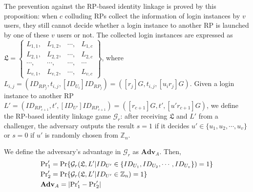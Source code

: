 The prevention against the RP-based identity linkage is proved
    by this proposition:
when $c$ colluding RPs collect the information of login instances by $v$ users,
    they still cannot decide whether a login instance to another RP is launched by one of these $v$ users or not.
The collected login instances are expressed as $\mathfrak{L}=\left\{ \begin{matrix}
L_{1,1}, & L_{1,2}, & \cdots, & L_{1,c}\\
L_{2,1}, & L_{2,2}, & \cdots, & L_{2,c}\\
\cdots, & \cdots, & \cdots, & \cdots\\
L_{v,1}, & L_{v,2}, & \cdots, & L_{v,c}
\end{matrix}\right\}$, where $L_{i, j} = (ID_{RP_j}, t_{i, j}, [ID_{U_i}]{ID_{RP_j}}) = ([r_j]G, t_{i,j}, [u_ir_j]G)$.
Given a login instance to another RP $L'=(ID_{RP_{c+1}}, t', [ID_{U'}]ID_{RP_{c+1}}) = ([r_{c+1}]G, t', [u'r_{c+1}]G)$,
we define the RP-based identity linkage game $\mathcal{G}_r$:
after receiving $\mathfrak{L}$ and $L'$ from a challenger,
    the adversary outputs the result $s = 1$ if it decides $u' \in \{u_1, u_2, \cdots, u_v\}$ or $s = 0$ if $u'$ is randomly chosen from $\mathbb{Z}_n$.


We define the adversary's advantage in $\mathcal{G}_r$ as $\mathbf{Adv}_{A}$.
Then,
\begin{align*}
&{\rm Pr}'_1={\rm Pr}\{\mathcal{G}_r(\mathfrak{L}, L'|ID_{U'} \in \{ID_{U_1}, ID_{U_2}, \cdots, ID_{U_v}\})=1\} \\
&{\rm Pr}'_2={\rm Pr}\{\mathcal{G}_r(\mathfrak{L}, L'|ID_{U'} \in \mathbb{Z}_n)=1\}\\
&{\mathbf{Adv}}_{A}=|{\rm Pr}'_1-{\rm Pr}'_2|
\end{align*}

